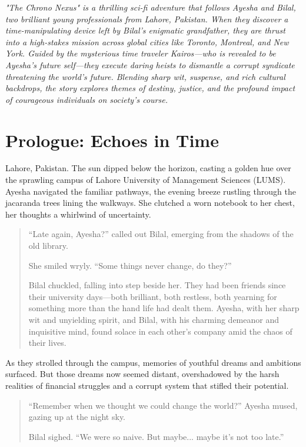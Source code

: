 \documentclass[12pt]{book}
\begin{document}
\emph{"The Chrono Nexus" is a thrilling sci-fi adventure that follows Ayesha and Bilal, two brilliant young professionals from Lahore, Pakistan. When they discover a time-manipulating device left by Bilal's enigmatic grandfather, they are thrust into a high-stakes mission across global cities like Toronto, Montreal, and New York. Guided by the mysterious time traveler Kairos—who is revealed to be Ayesha's future self—they execute daring heists to dismantle a corrupt syndicate threatening the world's future. Blending sharp wit, suspense, and rich cultural backdrops, the story explores themes of destiny, justice, and the profound impact of courageous individuals on society's course.}

\tableofcontents

\mainmatter

\chapter*{Prologue: Echoes in Time}

Lahore, Pakistan. The sun dipped below the horizon, casting a golden hue over the sprawling campus of Lahore University of Management Sciences (LUMS). Ayesha navigated the familiar pathways, the evening breeze rustling through the jacaranda trees lining the walkways. She clutched a worn notebook to her chest, her thoughts a whirlwind of uncertainty.

\begin{quote}
    ``Late again, Ayesha?'' called out Bilal, emerging from the shadows of the old library.

    She smiled wryly. ``Some things never change, do they?''

    Bilal chuckled, falling into step beside her. They had been friends since their university days---both brilliant, both restless, both yearning for something more than the hand life had dealt them. Ayesha, with her sharp wit and unyielding spirit, and Bilal, with his charming demeanor and inquisitive mind, found solace in each other's company amid the chaos of their lives.
\end{quote}

As they strolled through the campus, memories of youthful dreams and ambitions surfaced. But those dreams now seemed distant, overshadowed by the harsh realities of financial struggles and a corrupt system that stifled their potential.

\begin{quote}
    ``Remember when we thought we could change the world?'' Ayesha mused, gazing up at the night sky.

    Bilal sighed. ``We were so naive. But maybe... maybe it's not too late.''
\end{quote}
\end{document}
